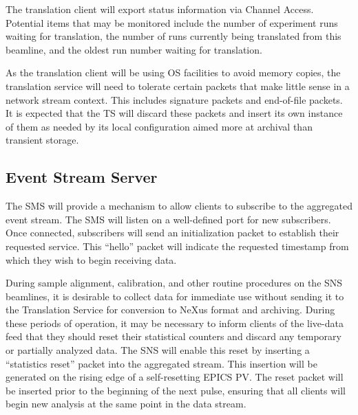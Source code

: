 The translation client will export status information via Channel Access.
Potential items that may be monitored include the number of experiment runs
waiting for translation, the number of runs currently being translated from
this beamline, and the oldest run number waiting for translation.

As the translation client will be using OS facilities to avoid memory copies,
the translation service will need to tolerate certain packets that make little
sense in a network stream context. This includes signature packets and
end-of-file packets. It is expected that the TS will discard these packets and
insert its own instance of them as needed by its local configuration aimed more
at archival than transient storage.




\subsection{Event Stream Server}

The SMS will provide a mechanism to allow clients to subscribe to the
aggregated event stream. The SMS will listen on a well-defined port for new
subscribers. Once connected, subscribers will send an initialization packet to
establish their requested service. This ``hello'' packet will indicate
the requested timestamp from which they wish to begin receiving data.

During sample alignment, calibration, and other routine procedures on
the SNS beamlines, it is desirable to collect data for immediate use
without sending it to the Translation Service for conversion to NeXus
format and archiving. During these periods of operation, it may be
necessary to inform clients of the live-data feed that they should reset
their statistical counters and discard any temporary or partially
analyzed data. The SNS will enable this reset by inserting a ``statistics
reset'' packet into the aggregated stream. This insertion will be
generated on the rising edge of a self-resetting EPICS PV. The reset packet
will be inserted prior to the beginning of the next pulse, ensuring that
all clients will begin new analysis at the same point in the data stream.





